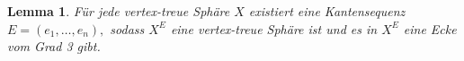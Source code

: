 \documentclass[12pt,titlepage,twoside,cleardoublepage]{article}
\theoremstyle{nummermitklammern}
\newtheorem{lemma}[temp]{Lemma}
\newtheorem{lemma}[zahl]{Lemma}
\numberwithin{equation}{section}
\begin{document}
\newpage 
\begin{lemma}\label{grad3}
Für  jede vertex-treue Sphäre $X$ existiert eine Kantensequenz $E=(e_1,\ldots,e_n),$ sodass $X^E$ eine vertex-treue Sphäre ist und es in $X^E$ eine Ecke vom Grad 3 gibt.
\end{lemma}
\begin{comment}
Beweisskizze\\
Die Idee des Beweises ist es, eine Folge von Ecken und damit auch eine Folge von vertex-treuen Sphären, entstanden durch das Anwenden von Kantensequenzen an $X$, zu konstruieren, sodass nach endlich vielen Schritten eine Ecke vom Grad 3 erzwungen wird. Hierfür wendet man iterativ Kantendrehungen an den Kanten ausgewählter Ecken der Sphäre an.
Falls dadurch eine Ecke an einer nicht drehbaren Kante liegt, gibt es 2 Fälle, die auftreten können. Entweder es gibt bereits eine Ecke vom Grad 3 oder die beiden anderen Ecken des von der Kante induzierten Butterflys sind adjazent.
 Falls also durch Anwenden einer allgemeinen Kantendrehung ein 2-Waist entsteht, kann man die Sphäre in zwei 2-Waist Komponenten unterteilen. Diese liefern den Schlüssel zum Nachweis der Aussage. Denn durch leichtes Abändern liefern diese Komponenten in der Sphäre, die eine Kantendrehung von der Sphäre mit dem 2-Waist entfernt ist, die Information, welche Ecken zum konstruieren Folge geeignet sind.
\end{comment}
\end{document}
